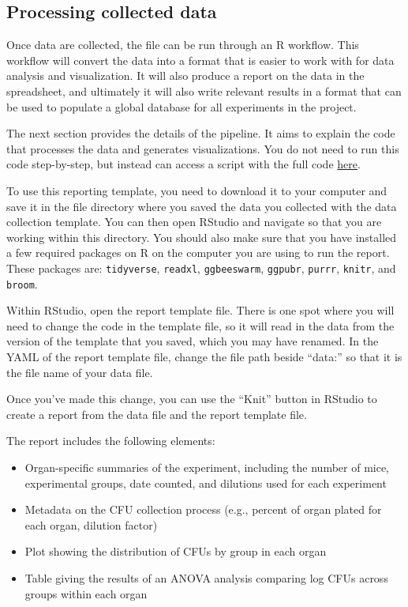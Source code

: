 \documentclass[
]{book}
\providecommand{\tightlist}{%
  \setlength{\itemsep}{0pt}\setlength{\parskip}{0pt}}
\begin{document}
\hypertarget{processing-collected-data-1}{%
\subsection{Processing collected data}\label{processing-collected-data-1}}

Once data are collected, the file can be run through an R workflow. This workflow
will convert the data into a format that is easier to work with for data analysis
and visualization. It will also produce a report on the data in the spreadsheet, and
ultimately it will also write relevant results in a format that can be used
to populate a global database for all experiments in the project.

The next section provides the details of the pipeline. It aims to explain the
code that processes the data and generates visualizations. You do not need to
run this code step-by-step, but instead can access a script with the full
code \href{https://raw.githubusercontent.com/csu-impactb/CODING-TEAM-BOOKDOWN-/main/templates/report_templates/cfu_report.Rmd}{here}.

To use this reporting template, you need to download it to your computer and
save it in the file directory where you saved the data you collected with the
data collection template. You can then open RStudio and navigate so that you are
working within this directory. You should also make sure that you have installed
a few required packages on R on the computer you are using to run the report.
These packages are: \texttt{tidyverse}, \texttt{readxl}, \texttt{ggbeeswarm}, \texttt{ggpubr}, \texttt{purrr},
\texttt{knitr}, and \texttt{broom}.

Within RStudio, open the report template file. There is one spot where you will
need to change the code in the template file, so it will read in the data from
the version of the template that you saved, which you may have renamed.
In the YAML of the report template file, change the file path beside ``data:''
so that it is the file name of your data file.

Once you've made this change, you can use the ``Knit'' button in RStudio to
create a report from the data file and the report template file.

The report includes the following elements:

\begin{itemize}
\tightlist
\item
  Organ-specific summaries of the experiment, including the number of mice,
  experimental groups, date counted, and dilutions used for each experiment
\item
  Metadata on the CFU collection process (e.g., percent of organ plated for
  each organ, dilution factor)
\item
  Plot showing the distribution of CFUs by group in each organ
\item
  Table giving the results of an ANOVA analysis comparing log CFUs
  across groups within each organ
\end{itemize}
\end{document}

